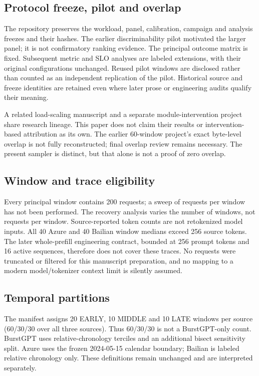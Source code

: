 \subsection{Protocol freeze, pilot and overlap}\label{sec:prereg}\label{sec:stage0}\label{sec:evidence-boundaries}\label{sec:overview}
The repository preserves the workload, panel, calibration, campaign and
analysis freezes and their hashes. The earlier discriminability pilot
motivated the larger panel; it is not confirmatory ranking evidence.
The principal outcome matrix is fixed. Subsequent metric and SLO analyses
are labeled extensions, with their original configurations unchanged.
Reused pilot windows are disclosed rather than counted as an independent
replication of the pilot. Historical source and freeze identities are
retained even where later prose or engineering audits qualify their meaning.

A related load-scaling manuscript and a separate module-intervention
project share research lineage. This paper does not claim their results
or intervention-based attribution as its own. The earlier 60-window
project's exact byte-level overlap is not fully reconstructed; final
overlap review remains necessary. The present sampler is distinct, but
that alone is not a proof of zero overlap.

\subsection{Window and trace eligibility}\label{sec:window-size}
Every principal window contains 200 requests; a sweep of requests per
window has not been performed. The recovery analysis varies the number
of windows, not requests per window. Source-reported token counts are not
retokenized model inputs. All 40 Azure and 40 Bailian window medians exceed
256 source tokens. The later whole-prefill engineering contract, bounded
at 256 prompt tokens and 16 active sequences, therefore does not cover
these traces. No requests were truncated or filtered for this manuscript
preparation, and no mapping to a modern model/tokenizer context limit is
silently assumed.

\subsection{Temporal partitions}\label{sec:temporal-design}
The manifest assigns 20 EARLY, 10 MIDDLE and 10 LATE windows per source
(60/30/30 over all three sources). Thus 60/30/30 is not a BurstGPT-only
count. BurstGPT uses relative-chronology terciles and an additional bisect
sensitivity split. Azure uses the frozen 2024-05-15 calendar boundary;
Bailian is labeled relative chronology only. These definitions remain
unchanged and are interpreted separately.
